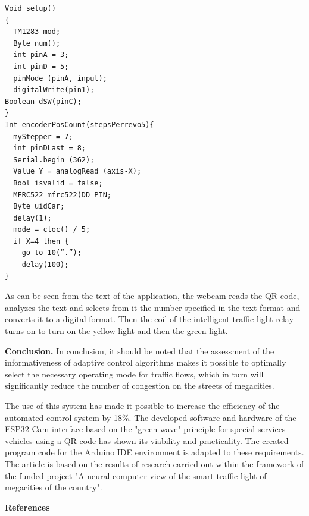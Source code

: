 \begin{verbatim}
Void setup()
{
  TM1283 mod;
  Byte num();
  int pinA = 3;
  int pinD = 5;
  pinMode (pinA, input);
  digitalWrite(pin1);
Boolean dSW(pinC);
}
Int encoderPosCount(stepsPerrevo5){
  myStepper = 7;
  int pinDLast = 8;
  Serial.begin (362);
  Value_Y = analogRead (axis-X);
  Bool isvalid = false;
  MFRC522 mfrc522(DD_PIN;
  Byte uidCar;
  delay(1);
  mode = cloc() / 5;
  if X=4 then {
    go to 10(“.”);
    delay(100);
}
\end{verbatim}

\begin{multicols}{2}
As can be seen from the text of the application, the webcam reads the QR
code, analyzes the text and selects from it the number specified in the
text format and converts it to a digital format. Then the coil of the
intelligent traffic light relay turns on to turn on the yellow light and
then the green light.

{\bfseries Conclusion.} In conclusion, it should be noted that the
assessment of the informativeness of adaptive control algorithms makes
it possible to optimally select the necessary operating mode for traffic
flows, which in turn will significantly reduce the number of congestion
on the streets of megacities.

The use of this system has made it possible to increase the efficiency
of the automated control system by 18\%. The developed software and
hardware of the ESP32 Cam interface based on the "green wave" principle
for special services vehicles using a QR code has shown its viability
and practicality. The created program code for the Arduino IDE
environment is adapted to these requirements. The article is based on
the results of research carried out within the framework of the funded
project "A neural computer view of the smart traffic light of megacities
of the country".
\end{multicols}

\begin{center}
{\bfseries References}
\end{center}

